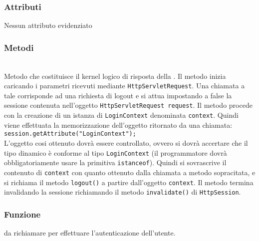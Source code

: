 \subsubsection*{Attributi}

Nessun attributo evidenziato

\subsubsection*{Metodi}
\begin{description}
	\item{}\\
	Metodo che costituisce il kernel logico di risposta della . Il metodo inizia caricando i parametri ricevuti mediante \texttt{HttpServletRequest}. Una chiamata a tale  corrisponde ad una richiesta di logout e si attua impostando a false la sessione contenuta nell'oggetto \texttt{HttpServletRequest request}. Il metodo procede con la creazione di un istanza  di \texttt{LoginContext} denominata \texttt{context}. Quindi viene effettuata la memorizzazione dell'oggetto ritornato da una chiamata:
\\
\verb|session.getAttribute("LoginContext");|
\\

L'oggetto cosi ottenuto dovrà essere controllato, ovvero si dovrà accertare che il tipo dinamico è conforme al tipo \texttt{LoginContext} (il programmatore dovrà obbligatoriamente usare   la primitiva \texttt{istanceof}). Quindi si sovrascrive il contenuto di \texttt{context} con quanto ottenuto dalla chiamata a metodo sopracitata, e si richiama il metodo \texttt{logout()} a partire dall'oggetto \texttt{context}. Il metodo termina invalidando la sessione richiamando il metodo \texttt{invalidate()} di \texttt{HttpSession}.

\end{description}


\subsubsection*{Funzione}
 da richiamare per effettuare l'autenticazione dell'utente.

